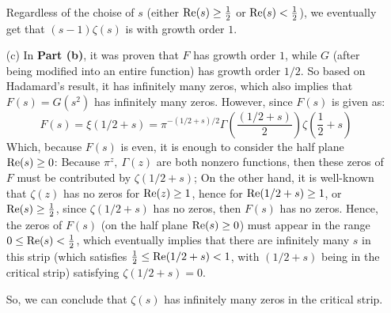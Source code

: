 \documentclass{article}
\begin{document}
\begin{itemize}
    \hfil

    Regardless of the choise of $s$ (either $\textmd{Re}(s)\geq \frac{1}{2}$ or $\textmd{Re}(s)<\frac{1}{2}$), we eventually get that $(s-1)\zeta(s)$ is with growth order $1$. 

    
    \hfil

    \item[(c)] In \textbf{Part (b)}, it was proven that $F$ has growth order $1$, while $G$ (after being modified into an entire function) has growth order $1/2$. So based on Hadamard's result, it has infinitely many zeros, which also implies that $F(s)=G(s^2)$ has infinitely many zeros. However, since $F(s)$ is given as:
    $$F(s)=\xi(1/2+s) =  \pi^{-(1/2+s)/2}\Gamma\left(\frac{(1/2+s)}{2}\right)\zeta\left(\frac{1}{2}+s\right)$$
    Which, because $F(s)$ is even, it is enough to consider the half plane $\textmd{Re}(s)\geq 0$: Because $\pi^{z},\ \Gamma(z)$ are both nonzero functions, then these zeros of $F$ must be contributed by $\zeta(1/2+s)$; On the other hand, it is well-known that $\zeta(z)$ has no zeros for $\textmd{Re}(z)\geq 1$, hence for $\textmd{Re}(1/2+s)\geq 1$, or $\textmd{Re}(s)\geq \frac{1}{2}$, since $\zeta(1/2+s)$ has no zeros, then $F(s)$ has no zeros.
    Hence, the zeros of $F(s)$ (on the half plane $\textmd{Re}(s)\geq 0$) must appear in the range $0\leq \textmd{Re}(s) < \frac{1}{2}$, which eventually implies that there are infinitely many $s$ in this strip (which satisfies $\frac{1}{2}\leq \textmd{Re}(1/2+s)<1$, with $(1/2+s)$ being in the critical strip) satisfying $\zeta(1/2+s) = 0$. 

    So, we can conclude that $\zeta(s)$ has infinitely many zeros in the critical strip.
\end{itemize}
\end{document}
